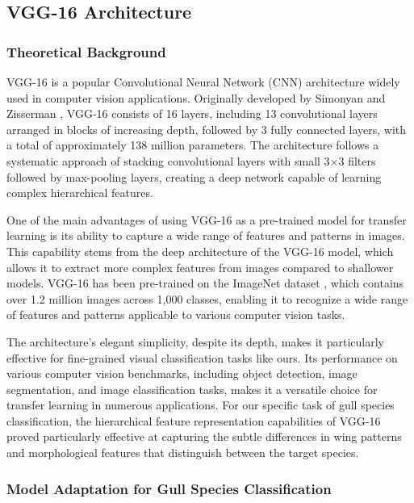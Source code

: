 \subsection{VGG-16 Architecture}

\subsubsection{Theoretical Background}

VGG-16 is a popular Convolutional Neural Network (CNN) architecture widely used in computer vision applications. Originally developed by Simonyan and Zisserman \citep{simonyan2014vgg}, VGG-16 consists of 16 layers, including 13 convolutional layers arranged in blocks of increasing depth, followed by 3 fully connected layers, with a total of approximately 138 million parameters. The architecture follows a systematic approach of stacking convolutional layers with small 3$\times$3 filters followed by max-pooling layers, creating a deep network capable of learning complex hierarchical features.

One of the main advantages of using VGG-16 as a pre-trained model for transfer learning is its ability to capture a wide range of features and patterns in images. This capability stems from the deep architecture of the VGG-16 model, which allows it to extract more complex features from images compared to shallower models. VGG-16 has been pre-trained on the ImageNet dataset \citep{deng2009imagenet}, which contains over 1.2 million images across 1,000 classes, enabling it to recognize a wide range of features and patterns applicable to various computer vision tasks.

The architecture's elegant simplicity, despite its depth, makes it particularly effective for fine-grained visual classification tasks like ours. Its performance on various computer vision benchmarks, including object detection, image segmentation, and image classification tasks, makes it a versatile choice for transfer learning in numerous applications. For our specific task of gull species classification, the hierarchical feature representation capabilities of VGG-16 proved particularly effective at capturing the subtle differences in wing patterns and morphological features that distinguish between the target species.

\subsubsection{Model Adaptation for Gull Species Classification}


